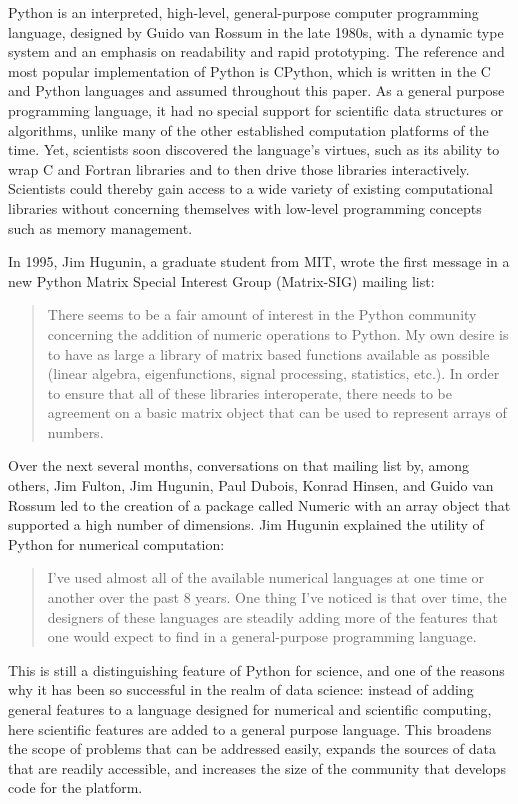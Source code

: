 \documentclass[fleqn,10pt]{wlscirep}
\begin{document}
Python is an interpreted, high-level, general-purpose computer programming
language, designed by Guido van Rossum in the late 1980s,
with a dynamic type system and an emphasis on readability and rapid prototyping.
The reference and most popular implementation of Python is 
CPython\cite{cpython-refman,cpython-source}, which is written
in the C and Python languages and assumed throughout this paper.
%
As a general purpose programming language, it had no special support for 
scientific data structures or algorithms, unlike many of the other established
computation platforms of the time. Yet, scientists soon discovered the
language's virtues, such as its ability to wrap C and Fortran
libraries and to then drive those libraries interactively.  Scientists
could thereby gain access to a wide variety of existing computational
libraries without concerning themselves with low-level programming
concepts such as memory management.

In 1995, Jim Hugunin, a graduate student from MIT, wrote the first
message in a new Python Matrix Special Interest Group (Matrix-SIG)
mailing list\cite{Hugunin-first}:
\begin{quote}
There seems to be a fair amount of interest in the Python community
concerning the addition of numeric operations to Python.  My own desire is
to have as large a library of matrix based functions available as possible
(linear algebra, eigenfunctions, signal processing, statistics, etc.).  In
order to ensure that all of these libraries interoperate, there needs to
be agreement on a basic matrix object that can be used to represent arrays
of numbers.
\end{quote}
Over the next several months, conversations on that mailing
list by, among others, Jim Fulton, Jim Hugunin, Paul Dubois, Konrad
Hinsen, and Guido van Rossum led to the creation of a package called Numeric with an array object
that supported a high number of dimensions.  Jim Hugunin explained the utility
of Python for numerical computation\cite{Hugunin-whitepaper}:
\begin{quote}
I've used almost all of the available numerical languages at one time
or another over the past 8 years. One thing I've noticed is that over
time, the designers of these languages are steadily adding more of the
features that one would expect to find in a general-purpose
programming language.
\end{quote}
This is still a distinguishing feature of Python for science, and one of the
reasons why it has been so successful in the realm of data science: instead of
adding general features to a language designed for numerical and scientific
computing, here scientific features are added to a general purpose language.  
This broadens the scope of problems that can be addressed easily, expands the
sources of data that are readily accessible, and increases the size of the
community that develops code for the platform.
\end{document}
